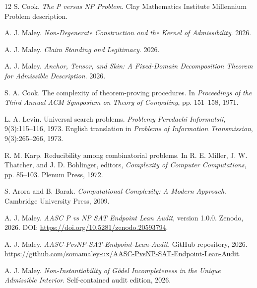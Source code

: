 \documentclass[11pt]{article}
\theoremstyle{definition}
\theoremstyle{remark}
\begin{document}
\begin{thebibliography}{12}
S. Cook.
\emph{The P versus NP Problem}.
Clay Mathematics Institute Millennium Problem description.

A. J. Maley.
\emph{Non-Degenerate Construction and the Kernel of Admissibility}.
2026.

A. J. Maley.
\emph{Claim Standing and Legitimacy}.
2026.

A. J. Maley.
\emph{Anchor, Tensor, and Skin: A Fixed-Domain Decomposition Theorem for Admissible Description}.
2026.

S. A. Cook.
The complexity of theorem-proving procedures.
In \emph{Proceedings of the Third Annual ACM Symposium on Theory of Computing},
pp. 151--158, 1971.

L. A. Levin.
Universal search problems.
\emph{Problemy Peredachi Informatsii}, 9(3):115--116, 1973.
English translation in \emph{Problems of Information Transmission}, 9(3):265--266, 1973.

R. M. Karp.
Reducibility among combinatorial problems.
In R. E. Miller, J. W. Thatcher, and J. D. Bohlinger, editors,
\emph{Complexity of Computer Computations},
pp. 85--103. Plenum Press, 1972.

S. Arora and B. Barak.
\emph{Computational Complexity: A Modern Approach}.
Cambridge University Press, 2009.

A. J. Maley.
\emph{AASC P vs NP SAT Endpoint Lean Audit}, version 1.0.0.
Zenodo, 2026. DOI: \url{https://doi.org/10.5281/zenodo.20593794}.

A. J. Maley.
\emph{AASC-PvsNP-SAT-Endpoint-Lean-Audit}.
GitHub repository, 2026. \url{https://github.com/somamaley-ux/AASC-PvsNP-SAT-Endpoint-Lean-Audit}.

A. J. Maley.
\emph{Non-Instantiability of G\"odel Incompleteness in the Unique Admissible Interior}.
Self-contained audit edition, 2026.
\end{thebibliography}
\end{document}
